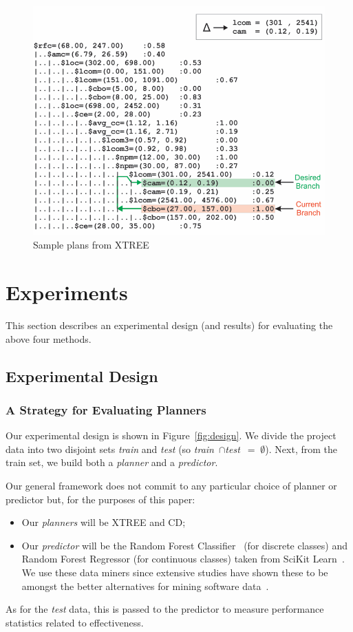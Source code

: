 \documentclass{sig-alternate}
\newcommand{\bi}{\begin{itemize}}
\newcommand{\ei}{\end{itemize}}
\newcommand{\fig}[1]{Figure~\ref{fig:#1}}
\begin{document}
\begin{figure}[btp!]
\centering
\includegraphics[width=\linewidth]{figs/XTREE_samp.png}
\caption{Sample plans from XTREE}\label{fig:xtree_samp}
\end{figure}


\section{Experiments}

This section describes an experimental design (and results) for evaluating the above four methods. 
\subsection{Experimental Design}

\subsubsection{A Strategy for Evaluating Planners}
 
Our experimental design is shown in \fig{design}. We divide the
project data  into two disjoint sets {\em train} and {\em test}
(so \mbox{{\em train} $\cap ${\em test} $=\;\emptyset$}).
Next, from the train set, we build both a {\em planner} and
 a {\em  predictor}. 

Our general framework does not   commit to any particular choice of { planner} or { predictor} but, for the purposes of this paper:
\bi
\item Our {\em planners} will be XTREE and CD;
\item Our  {\em predictor} will be the Random Forest Classifier~\cite{Breiman2001} (for discrete classes) and Random Forest Regressor (for continuous classes) taken from  SciKit Learn~\cite{Pedregosa2012}.   We use these
data miners since extensive studies have shown these to be amongst the better alternatives for mining software data~\cite{lessmann}.
\ei
As for the {\em test} data, this is passed to the { predictor}
to measure performance statistics related to effectiveness. 
\end{document}
